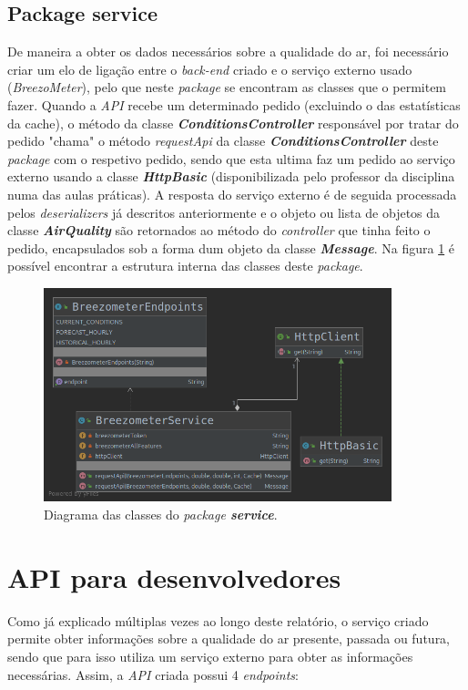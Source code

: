 \subsection{Package service}
De maneira a obter os dados necessários sobre a qualidade do ar, foi necessário criar um elo de ligação entre o \textit{back-end} criado e o serviço externo usado (\textit{BreezoMeter}), pelo que neste \textit{package} se encontram as classes que o permitem fazer. Quando a \textit{API} recebe um determinado pedido (excluindo o das estatísticas da cache), o método da classe \textbf{\textit{ConditionsController}} responsável por tratar do pedido "chama" o método \textit{requestApi} da classe \textbf{\textit{ConditionsController}} deste \textit{package} com o respetivo pedido, sendo que esta ultima faz um pedido ao serviço externo usando a classe \textbf{\textit{HttpBasic}} (disponibilizada pelo professor da disciplina numa das aulas práticas). A resposta do serviço externo é de seguida processada pelos \textit{deserializers} já descritos anteriormente e o objeto ou lista de objetos da classe \textbf{\textit{AirQuality}} são retornados ao método do \textit{controller} que tinha feito o pedido, encapsulados sob a forma dum objeto da classe \textbf{\textit{Message}}. Na figura \ref{fig:service_diagram} é possível encontrar a estrutura interna das classes deste \textit{package}.

\begin{figure}[h]
   \centering
   \includegraphics[width=0.90\textwidth]{images/service_diagram}
   \caption{Diagrama das classes do \textit{package \textbf{service}}.}
   \label{fig:service_diagram}
\end{figure}


\section{API para desenvolvedores}
Como já explicado múltiplas vezes ao longo deste relatório, o serviço criado permite obter informações sobre a qualidade do ar presente, passada ou futura, sendo que para isso utiliza um serviço externo para obter as informações necessárias. Assim, a \textit{API} criada possui 4 \textit{endpoints}:

